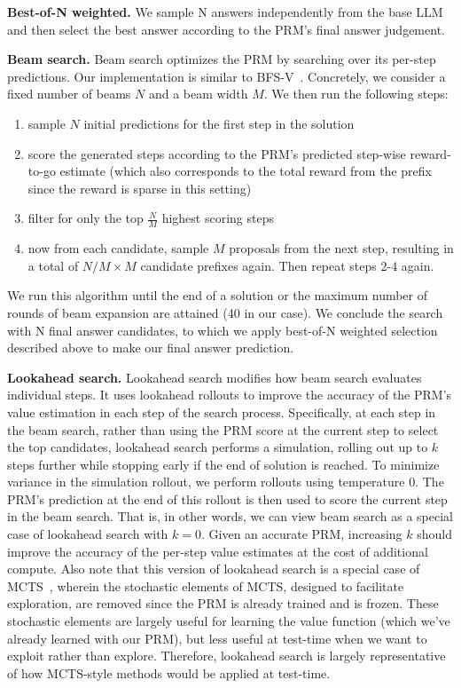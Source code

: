 \documentclass[11pt, letterpaper, logo]{googledeepmind}
\begin{document}
\textbf{Best-of-N weighted.} We sample N answers independently from the base LLM and then select the best answer according to the PRM's final answer judgement.

\textbf{Beam search.} Beam search optimizes the PRM by searching over its per-step predictions. Our implementation is similar to BFS-V~\citep{yao2023tree,feng2024alphazerolike}. Concretely, we consider a fixed number of beams $N$ and a beam width $M$. We then run the following steps:
\begin{enumerate}
\vspace{-0.2cm}
    \item sample $N$ initial predictions for the first step in the solution
    \item score the generated steps according to the PRM's predicted step-wise reward-to-go estimate (which also corresponds to the total reward from the prefix since the reward is sparse in this setting)
    \item filter for only the top $\frac{N}{M}$ highest scoring steps
    \item now from each candidate, sample $M$ proposals from the next step, resulting in a total of $N/M \times M$ candidate prefixes again. Then repeat steps 2-4 again. \vspace{-0.3cm}
\end{enumerate}
We run this algorithm until the end of a solution or the maximum number of rounds of beam expansion are attained (40 in our case). We conclude the search with N final answer candidates, to which we apply best-of-N weighted selection described above to make our final answer prediction.

\textbf{Lookahead search.} Lookahead search modifies how beam search evaluates individual steps.
It uses lookahead rollouts to improve the accuracy of the PRM's value estimation in each step of the search process.
Specifically, at each step in the beam search, rather than using the PRM score at the current step to select the top candidates, lookahead search performs a simulation, rolling out up to $k$ steps further while stopping early if the end of solution is reached. To minimize variance in the simulation rollout, we perform rollouts using temperature 0.
The PRM's prediction at the end of this rollout is then used to score the current step in the beam search.
That is, in other words, we can view beam search as a special case of lookahead search with $k=0$.
Given an accurate PRM, increasing $k$ should improve the accuracy of the per-step value estimates at the cost of additional compute.
Also note that this version of lookahead search is a special case of MCTS~\citep{suttonrlbook}, wherein the stochastic elements of MCTS, designed to facilitate exploration, are removed since the PRM is already trained and is frozen.
These stochastic elements are largely useful for learning the value function (which we've already learned with our PRM), but less useful at test-time when we want to exploit rather than explore.
Therefore, lookahead search is largely representative of how MCTS-style methods would be applied at test-time.
\end{document}
